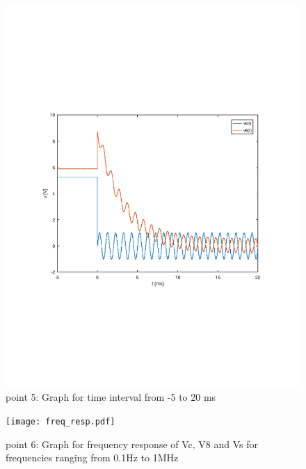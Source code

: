 \begin{figure}[h] \centering
\includegraphics[width=0.9\linewidth]{theo5_tab.pdf}
\caption{point 5: Graph for time interval from -5 to 20 ms}
\label{fig:theo5}
\end{figure}

\begin{figure}[h] \centering
\texttt{[image: freq\_resp.pdf]}
\caption{point 6: Graph for frequency response of Vc, V8 and Vs for frequencies ranging from 0.1Hz to 1MHz}
\label{fig:freq_resp}
\end{figure}






